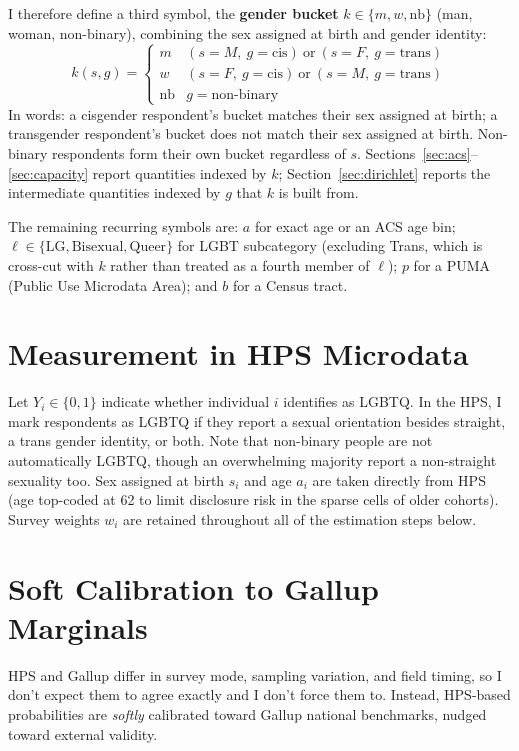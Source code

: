 \documentclass[11pt]{article}
\begin{document}
I therefore define a third symbol, the \textbf{gender bucket}
$k \in \{m, w, \text{nb}\}$ (man, woman, non-binary), combining the sex
assigned at birth and gender identity:
\[
k(s,g) =
\begin{cases}
  m  & (s=M,\ g=\text{cis}) \ \text{or}\ (s=F,\ g=\text{trans}) \\
  w  & (s=F,\ g=\text{cis}) \ \text{or}\ (s=M,\ g=\text{trans}) \\
  \text{nb} & g = \text{non-binary}
\end{cases}
\]
In words: a cisgender respondent's bucket matches their sex assigned at
birth; a transgender respondent's bucket does not match their
sex assigned at birth.  Non-binary respondents form their own bucket
regardless of $s$. Sections~\ref{sec:acs}--\ref{sec:capacity} report
quantities indexed by $k$; Section~\ref{sec:dirichlet} reports the
intermediate quantities indexed by $g$ that $k$ is built from.

The remaining recurring symbols are: $a$ for exact age or an ACS age bin;
$\ell \in \{\text{LG}, \text{Bisexual},
\text{Queer}\}$ for LGBT subcategory (excluding Trans, which is cross-cut
with $k$ rather than treated as a fourth member of $\ell$); $p$ for a PUMA
(Public Use Microdata Area); and $b$ for a Census tract.

\section{Measurement in HPS Microdata}

Let $Y_i \in \{0,1\}$ indicate whether individual $i$ identifies as LGBTQ.
In the HPS, I mark respondents as LGBTQ if they report a sexual orientation besides straight, a trans
gender identity, or both. Note that non-binary people are not automatically LGBTQ,
though an overwhelming majority report a non-straight sexuality too.
Sex assigned at birth $s_i$ and age $a_i$ are taken directly from HPS
(age top-coded at 62 to limit disclosure risk in the sparse cells of older cohorts).
Survey weights $w_i$ are retained throughout all of the estimation steps
below.

\section{Soft Calibration to Gallup Marginals}

HPS and Gallup differ in survey mode, sampling variation, and field timing,
so I don't expect them to agree exactly and I don't force them to.
Instead, HPS-based probabilities are \emph{softly} calibrated toward Gallup
national benchmarks, nudged toward external validity.
\end{document}
